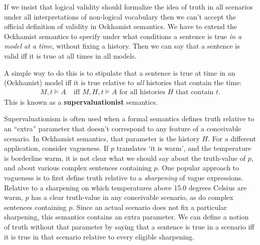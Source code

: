 
If we insist that logical validity should formalize the idea of truth in all
scenarios under all interpretations of non-logical vocabulary then we can't
accept the official definition of validity in Ockhamist semantics. We have to
extend the Ockhamist semantics to specify under what conditions a sentence is
true \emph{in a model at a time}, without fixing a history. Then we can say that
a sentence is valid iff it is true at all times in all models.

A simple way to do this is to stipulate that a sentence is true at time in an
(Ockhamist) model iff it is true relative to \emph{all} histories that contain
the time:
\begin{align*}
  M,t \models A & \;\text{iff $M,H,t \models A$ for all histories $H$ that contain $t$}.
\end{align*}
This is known as a \textbf{supervaluationist} semantics.

Supervaluationism is often used when a formal semantics defines truth relative
to an ``extra'' parameter that doesn't correspond to any feature of a
conceivable scenario. In Ockhamist semantics, that parameter is the history $H$. For a
different application, consider vagueness. If $p$ translates `it is warm', and
the temperature is borderline warm, it is not clear what we should say about the
truth-value of $p$, and about various complex sentences containing $p$. One
popular approach to vagueness is to first define truth relative to a
\emph{sharpening} of vague expressions. Relative to a sharpening on which
temperatures above 15.0 degrees Celsius are warm, $p$ has a clear truth-value in
any conceivable scenario, as do complex sentences containing $p$. Since an
actual scenario does not fix a particular sharpening, this semantics contains an
extra parameter. We can define a notion of truth without that parameter by
saying that a sentence is true in a scenario iff it is true in that scenario
relative to every eligible sharpening.

